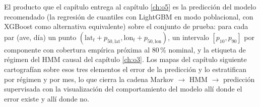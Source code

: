 El producto que el capítulo entrega al capítulo \ref{ch:o5} es la predicción del
modelo recomendado (la regresión de cuantiles con LightGBM en modo poblacional, con
XGBoost como alternativa equivalente) sobre el conjunto de prueba: para cada par
(ave, día) un punto $(\mathrm{lat}_t + p_{50,\mathrm{lat}}, \mathrm{lon}_t +
p_{50,\mathrm{lon}})$, un intervalo $[p_{10}, p_{90}]$ por componente con cobertura
empírica próxima al 80\,\% nominal, y la etiqueta de régimen del HMM causal del
capítulo \ref{ch:o3}. Los mapas del capítulo siguiente cartografían sobre esos tres
elementos el error de la predicción y lo estratifican por régimen y por mes, lo que
cierra la cadena Markov $\to$ HMM $\to$ predicción supervisada con la
visualización del comportamiento del modelo allí donde el error existe y allí donde
no.
